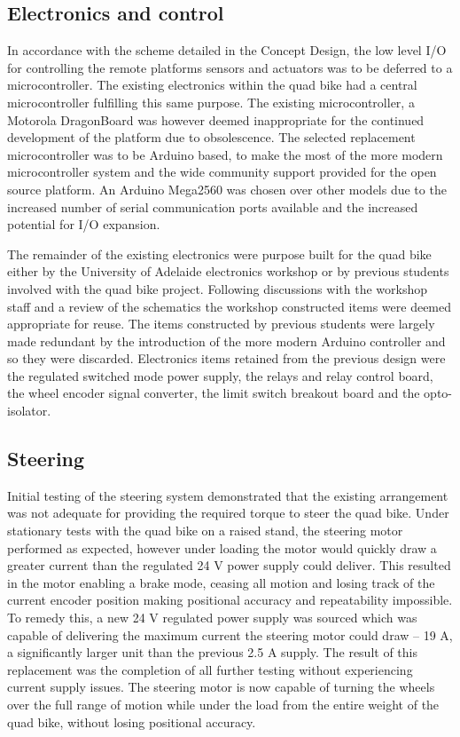 \documentclass[main.tex]{subfiles}
\begin{document}
\subsection{Electronics and control}
In accordance with the scheme detailed in the Concept Design, the low level I/O for controlling the remote platforms sensors and actuators was to be deferred to a microcontroller. The existing electronics within the quad bike had a central microcontroller fulfilling this same purpose. The existing microcontroller, a Motorola DragonBoard was however deemed inappropriate for the continued development of the platform due to obsolescence. The selected replacement microcontroller was to be Arduino based, to make the most of the more modern microcontroller system and the wide community support provided for the open source platform. An Arduino Mega2560 was chosen over other models due to the increased number of serial communication ports available and the increased potential for I/O expansion. 

The remainder of the existing electronics were purpose built for the quad bike either by the University of Adelaide electronics workshop or by previous students involved with the quad bike project. Following discussions with the workshop staff and a review of the schematics the workshop constructed items were deemed appropriate for reuse. The items constructed by previous students were largely made redundant by the introduction of the more modern Arduino controller and so they were discarded. Electronics items retained from the previous design were the regulated switched mode power supply, the relays and relay control board, the wheel encoder signal converter, the limit switch breakout board and the opto-isolator. 


\subsection{Steering}
Initial testing of the steering system demonstrated that the existing arrangement was not adequate for providing the required torque to steer the quad bike. Under stationary tests with the quad bike on a raised stand, the steering motor performed as expected, however under loading the motor would quickly draw a greater current than the regulated 24 V power supply could deliver. This resulted in the motor enabling a brake mode, ceasing all motion and losing track of the current encoder position making positional accuracy and repeatability impossible. To remedy this, a new 24 V regulated power supply was sourced which was capable of delivering the maximum current the steering motor could draw – 19 A, a significantly larger unit than the previous 2.5 A supply. The result of this replacement was the completion of all further testing without experiencing current supply issues. The steering motor is now capable of turning the wheels over the full range of motion while under the load from the entire weight of the quad bike, without losing positional accuracy.
\end{document}
